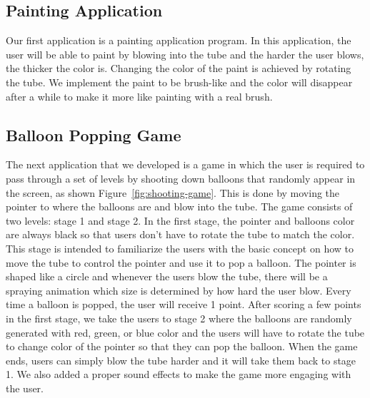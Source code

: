 \subsection{\textbf{Painting Application}}


Our first application is a painting application program. In this application, the user will be able to paint by blowing into the tube and the harder the user blows, the thicker the color is. Changing the color of the paint is achieved by rotating the tube. We implement the paint to be brush-like and the color will disappear after a while to make it more like painting with a real brush.

\subsection{\textbf{Balloon Popping Game}}

The next application that we developed is a game in which the user is required to pass through a set of levels by shooting down balloons that randomly appear in the screen, as shown Figure~\ref{fig:shooting-game}. This is done by moving the pointer to where the balloons are and blow into the tube. The game consists of two levels: stage 1 and stage 2. In the first stage, the pointer and balloons color are always black so that users don’t have to rotate the tube to match the color. This stage is intended to familiarize the users with the basic concept on how to move the tube to control the pointer and use it to pop a balloon. The pointer is shaped like a circle and whenever the users blow the tube, there will be a spraying animation which size is determined by how hard the user blow. Every time a balloon is popped, the user will receive 1 point. After scoring a few points in the first stage, we take the users to stage 2 where the balloons are randomly generated with red, green, or blue color and the users will have to rotate the tube to change color of the pointer so that they can pop the balloon. When the game ends, users can simply blow the tube harder and it will take them back to stage 1. We also added a proper sound effects to make the game more engaging with the user.

